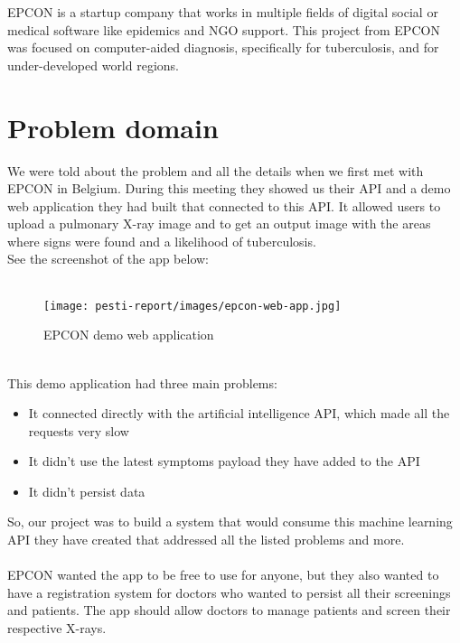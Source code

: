 EPCON is a startup company that works in multiple fields of digital social or medical software like epidemics and NGO support. This project from EPCON was focused on computer-aided diagnosis, specifically for tuberculosis, and for under-developed world regions.

\section{Problem domain}

We were told about the problem and all the details when we first met with EPCON in Belgium. During this meeting they showed us their API and a demo web application they had built that connected to this API. It allowed users to upload a pulmonary X-ray image and to get an output image with the areas where signs were found and a likelihood of tuberculosis. \cite{Biometrics}
\\
See the screenshot of the app below:
\\ \\

\begin{figure}[!h]
	\centering
	\texttt{[image: pesti-report/images/epcon-web-app.jpg]}
	\caption{EPCON demo web application}
	\label{fig:epcon-web-app}
\end{figure}

\\

This demo application had three main problems:

\begin{itemize}
\item
It connected directly with the artificial intelligence API, which made all the requests very slow
\item
It didn't use the latest symptoms payload they have added to the API
\item
It didn't persist data
\end{itemize}

So, our project was to build a system that would consume this machine learning API they have created that addressed all the listed problems and more.
\\ \\
EPCON wanted the app to be free to use for anyone, but they also wanted to have a registration system for doctors who wanted to persist all their screenings and patients. The app should allow doctors to manage patients and screen their respective X-rays.


